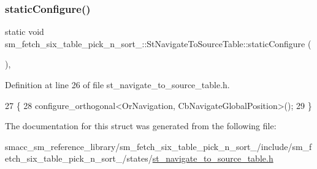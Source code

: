 \subsubsection{\texorpdfstring{static\+Configure()}{staticConfigure()}}
{\footnotesize\ttfamily static void sm\+\_\+fetch\+\_\+six\+\_\+table\+\_\+pick\+\_\+n\+\_\+sort\+\_\+::\+St\+Navigate\+To\+Source\+Table\+::static\+Configure (\begin{DoxyParamCaption}{ }\end{DoxyParamCaption})\hspace{0.3cm}{\ttfamily [inline]}, {\ttfamily [static]}}



Definition at line 26 of file st\+\_\+navigate\+\_\+to\+\_\+source\+\_\+table.\+h.


\begin{DoxyCode}
27         \{
28             configure\_orthogonal<OrNavigation, CbNavigateGlobalPosition>();
29         \}
\end{DoxyCode}


The documentation for this struct was generated from the following file\+:\begin{DoxyCompactItemize}
\item 
smacc\+\_\+sm\+\_\+reference\+\_\+library/sm\+\_\+fetch\+\_\+six\+\_\+table\+\_\+pick\+\_\+n\+\_\+sort\+\_/include/sm\+\_\+fetch\+\_\+six\+\_\+table\+\_\+pick\+\_\+n\+\_\+sort\+\_/states/\hyperlink{st__navigate__to__source__table_8h}{st\+\_\+navigate\+\_\+to\+\_\+source\+\_\+table.\+h}\end{DoxyCompactItemize}
